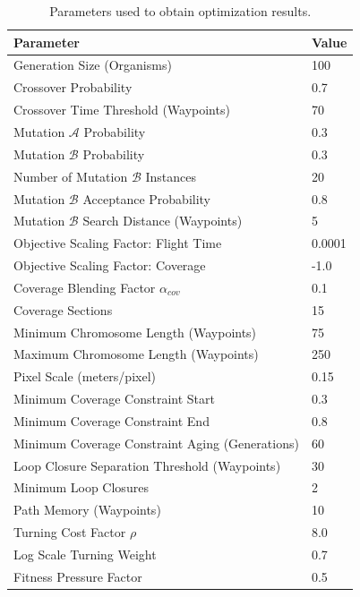 \documentclass[letterpaper, 10 pt, conference]{ieeeconf}  %
\begin{document}
\begin{table}
  \centering
  \caption{Parameters used to obtain optimization results.}
\begin{tabular}{l|l}
\hline
\multicolumn{1}{|l|}{Parameter}                 & \multicolumn{1}{l|}{Value} \\ \hline
Generation Size (Organisms)                        & 100                     \\
Crossover Probability                              & 0.7                     \\
Crossover Time Threshold (Waypoints)               & 70                      \\
Mutation $\mathcal{A}$ Probability                 & 0.3                     \\
Mutation $\mathcal{B}$ Probability                 & 0.3                     \\
Number of Mutation $\mathcal{B}$ Instances         & 20                      \\
Mutation $\mathcal{B}$ Acceptance Probability      & 0.8                     \\
Mutation $\mathcal{B}$ Search Distance (Waypoints) & 5                       \\
Objective Scaling Factor: Flight Time             & 0.0001                   \\
Objective Scaling Factor: Coverage                & -1.0                     \\
Coverage Blending Factor $\alpha_{cov}$            & 0.1                     \\
Coverage Sections                                  & 15                      \\
Minimum Chromosome Length (Waypoints)              & 75                      \\
Maximum Chromosome Length (Waypoints)              & 250                     \\
Pixel Scale (meters/pixel)                         & 0.15                    \\
Minimum Coverage Constraint Start                  & 0.3                     \\
Minimum Coverage Constraint End                    & 0.8                     \\
Minimum Coverage Constraint Aging (Generations)    & 60                      \\
Loop Closure Separation Threshold (Waypoints)      & 30                      \\
Minimum Loop Closures                              & 2                       \\
Path Memory (Waypoints)                            & 10                      \\
Turning Cost Factor $\rho$                         & 8.0                     \\
Log Scale Turning Weight                           & 0.7                     \\
Fitness Pressure Factor                            & 0.5                     \\


\end{tabular}
\end{table}
\end{document}
